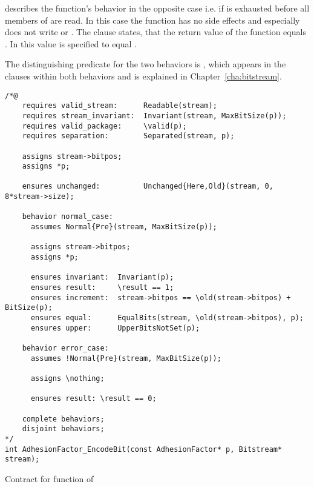  describes the function's behavior in the opposite case
i.e. if  is exhausted before all members of  are read.
In this case the function has no side effects and especially does not write
 or .
The  clause  states, that the return value
of the function equals . In  this value is specified to equal .

The distinguishing predicate for the two behaviors is ,
which appears in the  clauses within both behaviors and
is explained in Chapter~\ref{cha:bitstream}. 


\begin{listing}[hbt]
\begin{minipage}{0.99\textwidth}
\begin{lstlisting}[style=acsl-block]
/*@
    requires valid_stream:      Readable(stream);
    requires stream_invariant:  Invariant(stream, MaxBitSize(p));
    requires valid_package:     \valid(p);
    requires separation:        Separated(stream, p);

    assigns stream->bitpos;
    assigns *p;

    ensures unchanged:          Unchanged{Here,Old}(stream, 0, 8*stream->size);

    behavior normal_case:
      assumes Normal{Pre}(stream, MaxBitSize(p));

      assigns stream->bitpos;
      assigns *p;

      ensures invariant:  Invariant(p);
      ensures result:     \result == 1;
      ensures increment:  stream->bitpos == \old(stream->bitpos) + BitSize(p);
      ensures equal:      EqualBits(stream, \old(stream->bitpos), p);
      ensures upper:      UpperBitsNotSet(p);

    behavior error_case:
      assumes !Normal{Pre}(stream, MaxBitSize(p));

      assigns \nothing;

      ensures result: \result == 0;

    complete behaviors;
    disjoint behaviors;
*/
int AdhesionFactor_EncodeBit(const AdhesionFactor* p, Bitstream* stream);
\end{lstlisting}
\end{minipage}
\caption{\label{lst:adhesionfactor-decodebit}Contract for  function of }
\end{listing}

